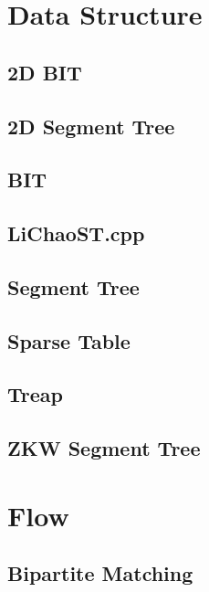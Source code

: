 \documentclass[a4paper,10pt,twocolumn,oneside]{article}
\begin{document}
\section{Data Structure}
\subsection{2D BIT}


\subsection{2D Segment Tree}


\subsection{BIT}


\subsection{LiChaoST.cpp}


\subsection{Segment Tree}


\subsection{Sparse Table}


\subsection{Treap}


\subsection{ZKW Segment Tree}


\section{Flow}
\subsection{Bipartite Matching}

\end{document}
